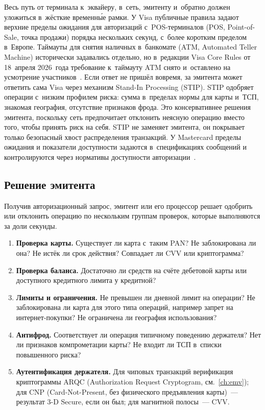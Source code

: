 Весь путь от терминала к~эквайеру, в~сеть, эмитенту и~обратно
должен уложиться в~жёсткие временн\'{ы}е рамки. У Visa публичные
правила задают верхние пределы ожидания для авторизаций
с~POS-терминалов (POS, Point-of-Sale, точка продажи)
порядка нескольких секунд, с~более коротким пределом в~Европе.
Таймауты для снятия наличных в~банкомате (ATM, Automated Teller
Machine) исторически задавались
отдельно, но в~редакции Visa Core Rules от 18~апреля 2026~года
требование к~таймауту ATM снято и~оставлено на усмотрение
участников~\cite{visa-core-rules}. Если ответ не пришёл вовремя,
за эмитента может ответить сама Visa через механизм Stand-In
Processing (STIP). STIP одобряет операции с~низким профилем
риска: сумма в~пределах нормы для карты и~ТСП, знакомая география,
отсутствие признаков фрода. Это консервативнее решения эмитента,
поскольку сеть предпочитает отклонить неясную операцию вместо
того, чтобы принять риск на себя. STIP не заменяет эмитента, он покрывает только безопасный
хвост распределения транзакций. У Mastercard пределы ожидания
и показатели доступности задаются в~спецификациях сообщений
и контролируются через нормативы доступности авторизации~\cite{visa-core-rules,mc-tpr}.

\subsection*{Решение эмитента}

Получив авторизационный запрос, эмитент или его процессор
решает одобрить или отклонить операцию по нескольким группам
проверок, которые выполняются за доли секунды.

\begin{enumerate}
  \item \textbf{Проверка карты.} Существует ли карта с~таким PAN?
    Не заблокирована ли она? Не истёк ли срок действия?
    Совпадает ли CVV или криптограмма?
  \item \textbf{Проверка баланса.} Достаточно ли средств на счёте
    дебетовой карты или доступного кредитного лимита
    у кредитной?
  \item \textbf{Лимиты и ограничения.} Не превышен ли дневной лимит
    на операции? Не заблокирована ли карта для этого типа
    операций, например запрет на интернет-покупки? Не ограничена ли
    география использования?
  \item \textbf{Антифрод.} Соответствует ли операция типичному
    поведению держателя? Нет ли признаков компрометации карты?
    Не входит ли ТСП в~списки повышенного риска?
  \item \textbf{Аутентификация держателя.} Для чиповых транзакций
    верификация криптограммы ARQC (Authorization Request
    Cryptogram, см.~\autoref{ch:emv}); для CNP (Card-Not-Present,
    без физического предъявления карты)~--- результат
    3-D Secure, если он был; для магнитной полосы~--- CVV.
\end{enumerate}

